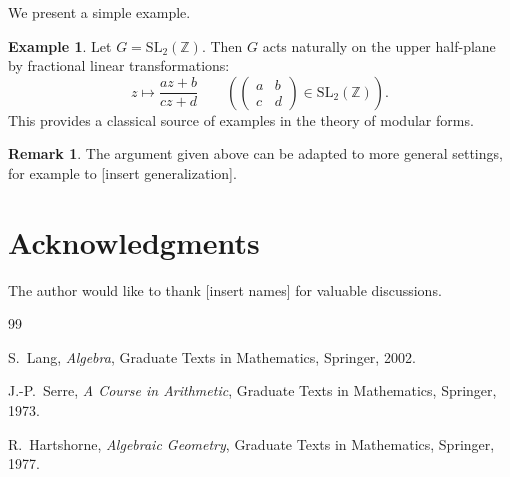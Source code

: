 \documentclass[11pt,a4paper]{article}
\theoremstyle{plain}
\theoremstyle{definition}
\newtheorem{example}[theorem]{Example}
\newtheorem{remark}[theorem]{Remark}
\newcommand{\Z}{\mathbb{Z}}
\newcommand{\SL}{\mathrm{SL}}
\begin{document}
We present a simple example.

\begin{example}
Let $G = \SL_2(\Z)$.
Then $G$ acts naturally on the upper half-plane by fractional linear transformations:
\[
  z \mapsto \frac{az+b}{cz+d}
  \qquad
  \left(
    \begin{pmatrix}
      a & b\\
      c & d
    \end{pmatrix}
    \in \SL_2(\Z)
  \right).
\]
This provides a classical source of examples in the theory of modular forms.
\end{example}

\begin{remark}
The argument given above can be adapted to more general settings,
for example to [insert generalization].
\end{remark}

\section*{Acknowledgments}

The author would like to thank [insert names] for valuable discussions.

\begin{thebibliography}{99}

S.~Lang,
\textit{Algebra},
Graduate Texts in Mathematics, Springer, 2002.

J.-P.~Serre,
\textit{A Course in Arithmetic},
Graduate Texts in Mathematics, Springer, 1973.

R.~Hartshorne,
\textit{Algebraic Geometry},
Graduate Texts in Mathematics, Springer, 1977.

\end{thebibliography}
\end{document}
